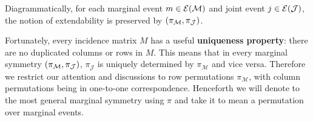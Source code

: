 \documentclass[aps, 10pt, english, twoside, pra, nofootinbib, longbibliography]{revtex4-1}
\theoremstyle{plain}
\theoremstyle{definition}
\theoremstyle{remark}
\newcommand{\mscenario}{\mathcal{M}}
\newcommand{\jointvar}{\mathcal{J}}
\newcommand{\term}[1]{\textcolor{Mahogany}{\textbf{#1}}}
\newcommand{\Events}[1]{\s{E}\br{#1}} %
\begin{document}

    Diagrammatically, for each marginal event $m \in \Events{\mscenario}$ and joint event $j \in \Events{\jointvar}$, the notion of extendability is preserved by $\br{\pi_\mscenario, \pi_\jointvar}$.
    \begin{center}
    \end{center}
    Fortunately, every incidence matrix $M$ has a useful \term{uniqueness property}: there are no duplicated columns or rows in $M$. This means that in every marginal symmetry $\br{\pi_\mscenario, \pi_\jointvar}$, $\pi_\jointvar$ is uniquely determined by $\pi_\mscenario$ and vice versa. Therefore we restrict our attention and discussions to row permutations $\pi_\mscenario$, with column permutations being in one-to-one correspondence. Henceforth we will denote to the most general marginal symmetry using $\pi$ and take it to mean a permutation over marginal events. \\
\end{document}
